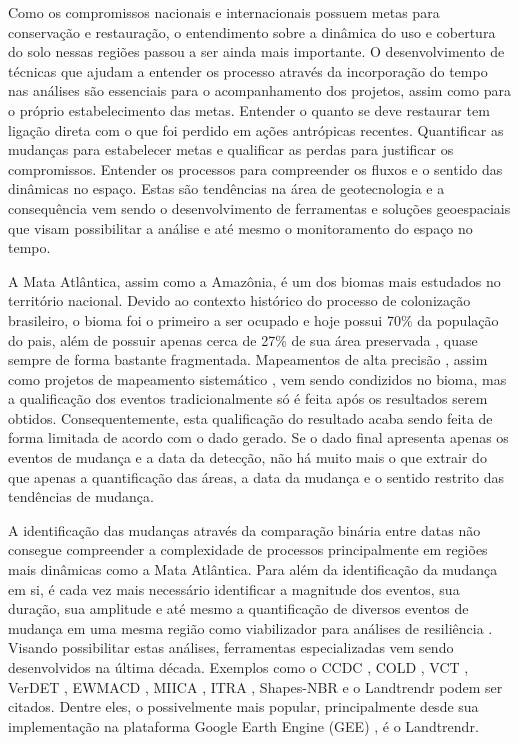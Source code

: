 Como os compromissos nacionais e internacionais possuem metas para conservação e restauração, o entendimento sobre a dinâmica do uso e cobertura do solo nessas regiões passou a ser ainda mais importante. O desenvolvimento de técnicas que ajudam a entender os processo através da incorporação do tempo nas análises são essenciais para o acompanhamento dos projetos, assim como para o próprio estabelecimento das metas. Entender o quanto se deve restaurar tem ligação direta com o que foi perdido em ações antrópicas recentes. Quantificar as mudanças para estabelecer metas e qualificar as perdas para justificar os compromissos. Entender os processos para compreender os fluxos e o sentido das dinâmicas no espaço. Estas são tendências na área de geotecnologia e a consequência vem sendo o desenvolvimento de ferramentas e soluções geoespaciais que visam possibilitar a análise e até mesmo o monitoramento do espaço no tempo.

A Mata Atlântica, assim como a Amazônia, é um dos biomas mais estudados no território nacional. Devido ao contexto histórico do processo de colonização brasileiro, o bioma foi o primeiro a ser ocupado e hoje possui 70\% da população do pais, além de possuir apenas cerca de 27\% de sua área preservada \citep{Carla2008}, quase sempre de forma bastante fragmentada. Mapeamentos de alta precisão \citep{Carla2008}, assim como projetos de mapeamento sistemático \citep{Souza2019}, vem sendo condizidos no bioma, mas a qualificação dos eventos tradicionalmente só é feita após os resultados serem obtidos. Consequentemente, esta qualificação do resultado acaba sendo feita de forma limitada de acordo com o dado gerado. Se o dado final apresenta apenas os eventos de mudança e a data da detecção, não há muito mais o que extrair do que apenas a quantificação das áreas, a data da mudança e o sentido restrito das tendências de mudança.

A identificação das mudanças através da comparação binária entre datas não consegue compreender a complexidade de processos principalmente em regiões mais dinâmicas como a Mata Atlântica. Para além da identificação da mudança em si, é cada vez mais necessário identificar a magnitude dos eventos, sua duração, sua amplitude e até mesmo a quantificação de diversos eventos de mudança em uma mesma região como viabilizador para análises de resiliência \citep{Jakovac2015}. Visando possibilitar estas análises, ferramentas especializadas vem sendo desenvolvidos na última década. Exemplos como o CCDC \citep{ZHU2014152}, COLD \citep{Cohen2020}, VCT \citep{Huang2010, THOMAS201119} , VerDET \citep{Hughes2017}, EWMACD \citep{Brooks2014}, MIICA \citep{JIN2013159}, ITRA \citep{VOGELMANN201292}, Shapes-NBR \citep{Meyer2013, Moisen2016} e o Landtrendr \citep{KENNEDY20102897, KENNEDY2012117} podem ser citados.
Dentre eles, o possivelmente mais popular, principalmente desde sua implementação na plataforma Google Earth Engine (GEE) \citep{Kennedy2018}, é o Landtrendr.

